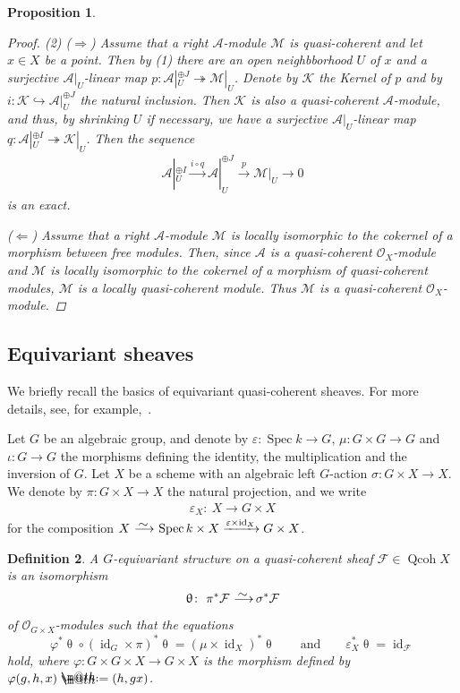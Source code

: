 \documentclass[11pt]{article}
\makeatletter
\numberwithin{equation}{section}
\newtheorem{dfn}{Definition}[section]
\newtheorem{prop}[dfn]{Proposition}
\newcommand*{\defeq}{\mathrel{\rlap{%
 \raisebox{0.3ex}{$\m@th\cdot$}}%
 \raisebox{-0.3ex}{$\m@th\cdot$}}%
 =}
\numberwithin{equation}{section}
\newcommand{\Spec}{\operatorname{Spec}}
\newcommand{\Qcoh}{\operatorname{Qcoh}}
\newcommand{\id}{\operatorname{id}}
\newcommand{\cA}{\mathcal{A}}
\newcommand{\cF}{\mathcal{F}}
\newcommand{\cK}{\mathcal{K}}
\newcommand{\cM}{\mathcal{M}}
\newcommand{\cO}{\mathcal{O}}
\newcommand{\simto}{\,\,\,\,\raisebox{4pt}{$\sim$}{\kern -1.1em \longrightarrow}\,}
\newcommand{\hookto}{\hookrightarrow}
\newcommand{\surjto}{\twoheadrightarrow}
\makeatother
\begin{document}
\begin{prop}
\begin{proof}
 (2) ($\Rightarrow$) Assume that a right $\cA$-module $\cM$ is quasi-coherent and let $x\in X$ be a point. Then by (1) there are an open neighbborhood $U$ of $x$ and a surjective $\cA|_U$-linear map $p \colon \cA|_U^{\oplus J}\surjto \cM|_U$. Denote by $\cK$ the Kernel of $p$ and by $i\colon \cK\hookto \cA|_U^{\oplus J}$ the natural inclusion. Then $\cK$ is also a quasi-coherent $\cA$-module, and thus, by shrinking $U$ if necessary, we have a surjective $\cA|_U$-linear map $q \colon \cA|_U^{\oplus I}\surjto \cK|_U$. Then the sequence
 \begin{gather*}
 \cA|_U^{\oplus I}\xrightarrow{i \circ q}\cA|_U^{\oplus J}\xrightarrow{p}\cM|_U\to 0
 \end{gather*}
is an exact.

($\Leftarrow$) Assume that a right $\cA$-module $\cM$ is locally isomorphic to the cokernel of a morphism between free modules. Then, since $\cA$ is a quasi-coherent $\cO_X$-module and $\cM$ is locally isomorphic to the cokernel of a morphism of quasi-coherent modules, $\cM$ is a locally quasi-coherent module. Thus $\cM$ is a quasi-coherent $\cO_X$-module.
 \end{proof}
\end{prop}

\subsection{Equivariant sheaves}\label{equiv section}
We briefly recall the basics of equivariant quasi-coherent sheaves. For more details, see, for example,~\cite[Section~2]{bfk}.

Let $G$ be an algebraic group, and denote by $\varepsilon\colon \Spec k\to G$, $\mu\colon G\times G\to G$ and $\iota\colon G\to G$ the morphisms defining the identity, the multiplication and the inversion of $G$.
Let $X$ be a scheme with an algebraic left $G$-action $\sigma\colon G\times X \to X$. We denote by $\pi\colon G\times X\to X$ the natural projection, and we write
\begin{gather*}
\varepsilon_X\colon\ X\to G\times X
\end{gather*}
for the composition $X\simto \Spec k\times X\xrightarrow{ \varepsilon\times \id_X}G\times X$. \begin{dfn}
A {\it $G$-equivariant structure} on a quasi-coherent sheaf $\cF\in \Qcoh X$ is an isomorphism
\begin{gather*}
\uptheta\colon\ \pi^*\cF\simto \sigma^*\cF
\end{gather*}
of $\cO_{G\times X}$-modules such that the equations
\begin{equation}\label{compati}
\varphi^*\uptheta\circ (\id_G\times\pi)^*\uptheta=(\mu\times\id_X )^*\uptheta \qquad\text{and}\qquad
\varepsilon_X^*\uptheta=\id_{\cF}
\end{equation}
hold, where $\varphi\colon G\times G\times X\to G\times X$ is the morphism defined by $\varphi(g,h,x)\defeq(h,gx)$.
\end{dfn}
\end{document}
